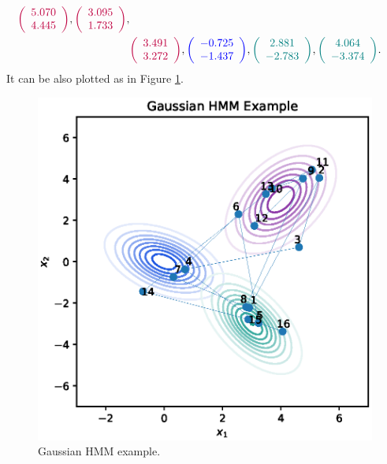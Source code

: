 \documentclass[shortabstract]{iithesis}
\begin{document}
\begin{equation*}
\begin{aligned}
        \textcolor{purple}{\left(\begin{array}{c} 5.070\\4.445\end{array}\right)},
        \textcolor{purple}{\left(\begin{array}{c} 3.095\\1.733\end{array}\right)}, \\
        &\textcolor{purple}{\left(\begin{array}{c} 3.491\\3.272\end{array}\right)},
        \textcolor{blue}{\left(\begin{array}{c} -0.725\\-1.437\end{array}\right)},
        \textcolor{teal}{\left(\begin{array}{c} 2.881\\-2.783\end{array}\right)},
        \textcolor{teal}{\left(\begin{array}{c} 4.064\\-3.374\end{array}\right)}\text{.}
    \end{aligned}
\end{equation*}
\linebreak
It can be also plotted as in Figure \ref{fig:example_gaussian}.
\begin{figure}[!ht]
    \centering
    \includegraphics[scale=.7]{gaussian_hmm_example.eps}
    \caption{Gaussian HMM example.}
    \label{fig:example_gaussian}
\end{figure}
\end{document}
